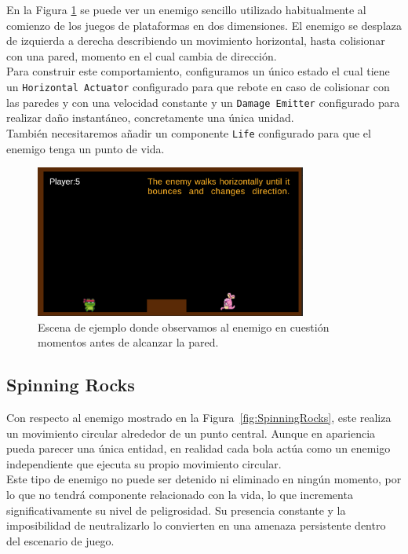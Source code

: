 En la Figura \ref{fig:BouncingBunny} se puede ver un enemigo sencillo utilizado habitualmente al comienzo de los juegos de plataformas en dos dimensiones. El enemigo se desplaza de izquierda a derecha describiendo un movimiento horizontal, hasta colisionar con una pared, momento en el cual cambia de dirección.\\

Para construir este comportamiento, configuramos un único estado el cual tiene un \texttt{Horizontal Actuator} configurado para que rebote en caso de colisionar con las paredes y con una velocidad constante y un \texttt{Damage Emitter} configurado para realizar daño instantáneo, concretamente una única unidad.\\

También necesitaremos añadir un componente \texttt{Life} configurado para que el enemigo tenga un punto de vida.

\begin{figure}[t]
	\centering
	\includegraphics[height=5cm]{Imagenes/BouncingBunny.png}
	\caption{Escena de ejemplo donde observamos al enemigo en cuestión momentos antes de alcanzar la pared.}
	\label{fig:BouncingBunny}
\end{figure}

\subsection{Spinning Rocks}

Con respecto al enemigo mostrado en la Figura~\ref{fig:SpinningRocks}, este realiza un movimiento circular alrededor de un punto central. Aunque en apariencia pueda parecer una única entidad, en realidad cada bola actúa como un enemigo independiente que ejecuta su propio movimiento circular.\\

Este tipo de enemigo no puede ser detenido ni eliminado en ningún momento, por lo que no tendrá componente relacionado con la vida, lo que incrementa significativamente su nivel de peligrosidad. Su presencia constante y la imposibilidad de neutralizarlo lo convierten en una amenaza persistente dentro del escenario de juego.\\

